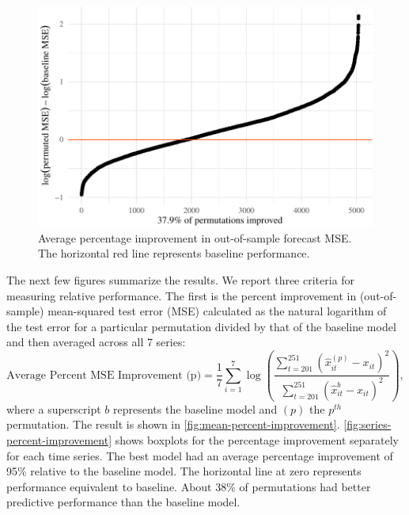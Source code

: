 \documentclass[11pt]{article}
\renewcommand{\hat}{\widehat}
\begin{document}
\begin{figure}[t]

{\centering \includegraphics{gfx/mean-percent-improvement-1} 

}

\caption{Average percentage improvement in out-of-sample forecast MSE. The horizontal red line represents baseline performance.}\label{fig:mean-percent-improvement}
\end{figure}

The next few figures summarize the results. We report three criteria for
measuring relative performance. The first is the percent improvement in
(out-of-sample) mean-squared test error (MSE) calculated as the natural
logarithm of the test error for a particular permutation divided by that
of the baseline model and then averaged across all 7 series:
\begin{equation}
  \mbox{Average Percent MSE Improvement (p)} = \frac{1}{7} \sum_{i=1}^7 \log
  \left(\frac{\sum_{t=201}^{251} (\hat{x}_{it}^{(p)}-x_{it})^2}
    {\sum_{t=201}^{251} (\hat{x}_{it}^{b}-x_{it})^2}\right),
\end{equation} where a superscript \(b\) represents the baseline model
and \((p)\) the \(p^{th}\) permutation. The result is shown in
\autoref{fig:mean-percent-improvement}.
\autoref{fig:series-percent-improvement} shows boxplots for the
percentage improvement separately for each time series. The best model
had an average percentage improvement of 95\% relative to the baseline
model. The horizontal line at zero represents performance equivalent to
baseline. About 38\% of permutations had better predictive performance
than the baseline model.
\end{document}
